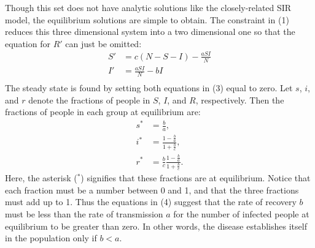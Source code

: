 \documentclass[prb,aps,twocolumn,showpacs,10pt]{revtex4-1}
\begin{document}
Though this set does not have analytic solutions like the closely-related SIR model, the equilibrium solutions are simple to obtain. The constraint in (1) reduces this three dimensional system into a two dimensional one so that the equation for $R'$ can just be omitted:
\begin{equation}
\begin{split}
S'&=c(N-S-I)-\frac{aSI}{N}\\
I'&=\frac{aSI}{N}-bI\\
\end{split}
\end{equation}
The steady state is found by setting both equations in (3) equal to zero. Let $s$, $i$, and $r$ denote the fractions of people in $S$, $I$, and $R$, respectively. Then the fractions of people in each group at equilibrium are:
\begin{equation}
\begin{split}
s^* &= \frac{b}{a},\\
i^* &= \frac{1-\frac{b}{a}}{1+\frac{b}{c}},\\
r^* &= \frac{b}{c}\frac{1-\frac{b}{a}}{1+\frac{b}{c}}.
\end{split}
\end{equation}
Here, the asterisk ($^*$) signifies that these fractions are at equilibrium. Notice that each fraction must be a number between 0 and 1, and that the three fractions must add up to 1. Thus the equations in (4) suggest that the rate of recovery $b$ must be less than the rate of transmission $a$ for the number of infected people at equilibrium to be greater than zero. In other words, the disease establishes itself in the population only if $b<a$. \\
\end{document}
